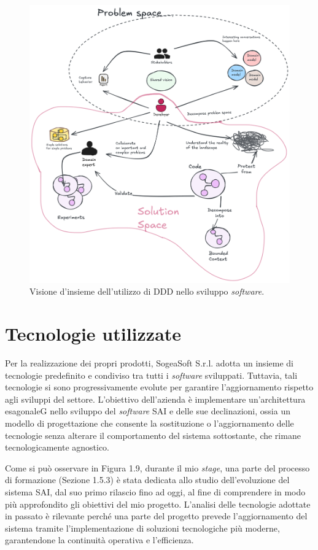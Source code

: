         \begin{figure}[H]
            \centering
            \includegraphics[width=0.6\linewidth]{BCS-Tessi/images/DDD_generale.png}
            \caption{Visione d'insieme dell'utilizzo di DDD nello sviluppo \textit{software}.}
            \label{fig:DDD-riassunto}
        \end{figure}

        
    \section{Tecnologie utilizzate}
    
    Per la realizzazione dei propri prodotti, SogeaSoft S.r.l. adotta un insieme di tecnologie predefinito e condiviso tra tutti i \textit{software} sviluppati. Tuttavia, tali tecnologie si sono progressivamente evolute per garantire l’aggiornamento rispetto agli sviluppi del settore. L’obiettivo dell’azienda è implementare un’architettura esagonaleG nello sviluppo del \textit{software} SAI e delle sue declinazioni, ossia un modello di progettazione che consente la sostituzione o l’aggiornamento delle tecnologie senza alterare il comportamento del sistema sottostante, che rimane tecnologicamente agnostico.  

    \noindent Come si può osservare in Figura 1.9, durante il mio \textit{stage}, una parte del processo di formazione (Sezione 1.5.3) è stata dedicata allo studio dell’evoluzione del sistema SAI, dal suo primo rilascio fino ad oggi, al fine di comprendere in modo più approfondito gli obiettivi del mio progetto. L’analisi delle tecnologie adottate in passato è rilevante perché una parte del progetto prevede l’aggiornamento del sistema tramite l’implementazione di soluzioni tecnologiche più moderne, garantendone la continuità operativa e l’efficienza.

